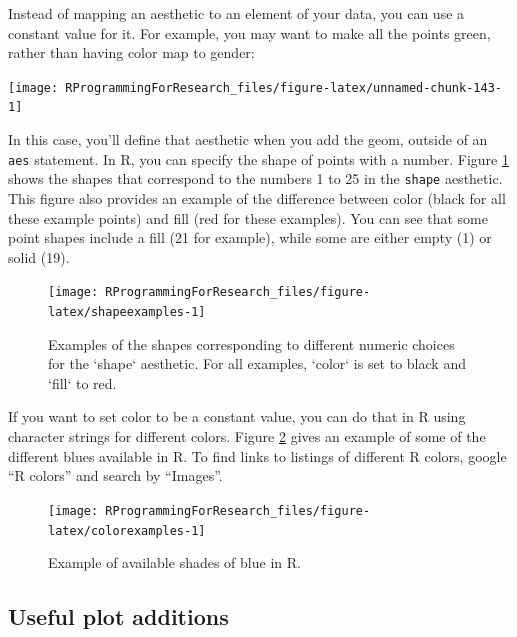 \documentclass[]{book}
\theoremstyle{definition}
\theoremstyle{definition}
\theoremstyle{definition}
\theoremstyle{remark}
\begin{document}
Instead of mapping an aesthetic to an element of your data, you can use
a constant value for it. For example, you may want to make all the
points green, rather than having color map to gender:

\begin{center}\texttt{[image: RProgrammingForResearch\_files/figure-latex/unnamed-chunk-143-1]} \end{center}

In this case, you'll define that aesthetic when you add the geom,
outside of an \texttt{aes} statement. In R, you can specify the shape of
points with a number. Figure \ref{fig:shapeexamples} shows the shapes
that correspond to the numbers 1 to 25 in the \texttt{shape} aesthetic.
This figure also provides an example of the difference between color
(black for all these example points) and fill (red for these examples).
You can see that some point shapes include a fill (21 for example),
while some are either empty (1) or solid (19).

\begin{figure}

{\centering \texttt{[image: RProgrammingForResearch\_files/figure-latex/shapeexamples-1]} 

}

\caption{Examples of the shapes corresponding to different numeric choices for the `shape` aesthetic. For all examples, `color` is set to black and `fill` to red.}\label{fig:shapeexamples}
\end{figure}

If you want to set color to be a constant value, you can do that in R
using character strings for different colors. Figure
\ref{fig:colorexamples} gives an example of some of the different blues
available in R. To find links to listings of different R colors, google
``R colors'' and search by ``Images''.

\begin{figure}

{\centering \texttt{[image: RProgrammingForResearch\_files/figure-latex/colorexamples-1]} 

}

\caption{Example of available shades of blue in R.}\label{fig:colorexamples}
\end{figure}

\subsection{Useful plot additions}\label{useful-plot-additions}
\end{document}
